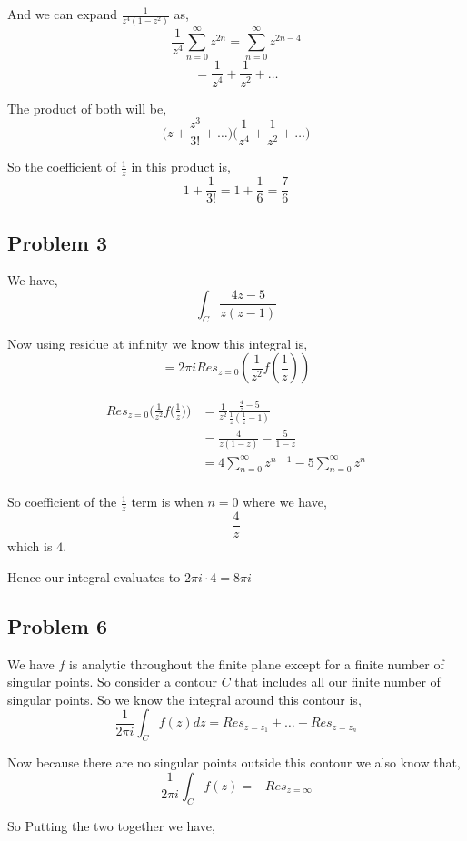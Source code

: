 \documentclass[a4paper]{report}
\begin{document}
    And we can expand $\frac{1}{z^{4}(1 - z^2)}$ as, 
$$ \frac{1}{z^{4}} \sum_{n=0}^{\infty} z^{2n}=  \sum_{n=0}^{\infty} z^{2n - 4} $$ 
$$  = \frac{1}{z^{4}} + \frac{1}{z^2} + \dots$$ 

The product of both will be, 
$$ \bigg ( z + \frac{z^{3}}{3!} + \dots\bigg )  \bigg ( \frac{1}{z^{4}} + \frac{1}{z^2} + \dots\bigg )$$ 

So the coefficient of $\frac{1}{z}$ in this product is, 
$$ 1 + \frac{1}{3!} = 1 + \frac{1}{6} = \frac{7}{6} $$ 


\subsection*{Problem 3}
We have, 
$$ \int_C \frac{4z - 5}{z (z - 1)} $$ 

Now using residue at infinity we know this integral is, 
$$ = 2\pi i Res_{z = 0}(\frac{1}{z^2}f(\frac{1}{z})) $$ 

\begin{align*}
    Res_{z = 0} \bigg ( \frac{1}{z^2}f\bigg(\frac{1}{z}\bigg)\bigg)&= \frac{1}{z^2} \frac{ \frac{4}{z} - 5}{\frac{1}{z}(\frac{1}{z}-1)}\\
                                                                   &= \frac{4}{z(1-z)} - \frac{5}{1-z}\\
                                                                   &= 4 \sum_{n=0}^{\infty} z^{n-1} - 5 \sum_{n=0}^{\infty} z^{n}\\
\end{align*}

So coefficient of the $\frac{1}{z}$ term is when $n = 0$ where we have, 
$$ \frac{4}{z} $$ which is $4$.

Hence our integral evaluates to $2\pi i \cdot  4 = 8\pi i$


\subsection*{Problem 6}
We have $f$ is analytic throughout the finite plane except for a finite number of singular points. So consider a contour $C$ that includes all our finite number of singular points. So we know the integral around this contour is,
$$ \frac{1}{2\pi i} \int_C f(z) dz=  Res_{z=z_1} + \dots + Res_{z = z_n} $$ 

Now because there are no singular points outside this contour we also know that, 
$$ \frac{1}{2\pi i}\int_C f(z) = - Res_{z=\infty} $$ 


So Putting the two together we have, 
\end{document}
